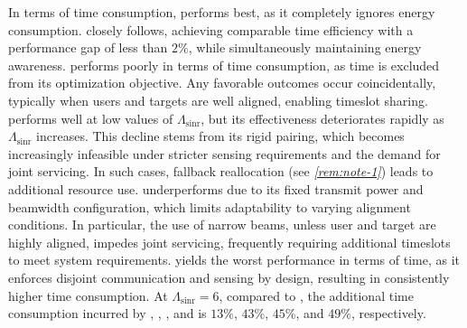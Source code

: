\documentclass[10pt,journal,compsoc]{IEEEtran}
\newcommand\mytextsf{\bfseries\sffamily\fontsize{9pt}{9pt}\selectfont}
\theoremstyle{myremark}
\theoremstyle{myexample}
\begin{document}
 
In terms of time consumption, {\mytextsf{TLB}} performs best, as it completely ignores energy consumption. {\mytextsf{OPT}} closely follows, achieving comparable time efficiency with a performance gap of less than $ 2\% $, while simultaneously maintaining energy awareness. {\mytextsf{ELB}} performs poorly in terms of time consumption, as time is excluded from its optimization objective. Any favorable outcomes occur coincidentally, typically when users and targets are well aligned, enabling timeslot sharing. {\mytextsf{BL1}} performs well at low values of $ \Lambda_{\mathrm{sinr}} $, but its effectiveness deteriorates rapidly as $ \Lambda_{\mathrm{sinr}} $ increases. This decline stems from its rigid pairing, which becomes increasingly infeasible under stricter sensing requirements and the demand for joint servicing. In such cases, fallback reallocation (see \emph{\cref{rem:note-1}}) leads to additional resource use. {\mytextsf{BL2}} underperforms due to its fixed transmit power and beamwidth configuration, which limits adaptability to varying alignment conditions. In particular, the use of narrow beams, unless  user and target are highly aligned, impedes joint servicing, frequently requiring additional timeslots to meet system requirements. {\mytextsf{BL3}} yields the worst performance in terms of time, as it enforces disjoint communication and sensing by design, resulting in consistently higher time consumption. At $ \Lambda_{\mathrm{sinr}} = 6 $, compared to {\mytextsf{OPT}}, the additional time consumption incurred by {\mytextsf{BL1}}, {\mytextsf{BL2}}, {\mytextsf{ELB}}, and {\mytextsf{BL3}} is $ 13\% $, $ 43\% $, $ 45\% $, and $ 49\% $, respectively.




\end{document}
